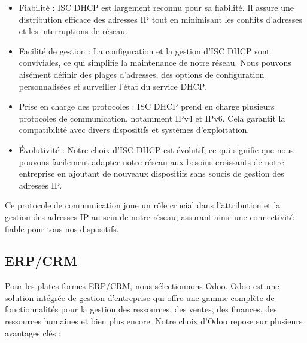 \begin{itemize}

\item Fiabilité : ISC DHCP est largement reconnu pour sa fiabilité. Il assure une distribution efficace des adresses IP tout en minimisant les conflits d'adresses et les interruptions de réseau.

\item Facilité de gestion : La configuration et la gestion d'ISC DHCP sont conviviales, ce qui simplifie la maintenance de notre réseau. Nous pouvons aisément définir des plages d'adresses, des options de configuration personnalisées et surveiller l'état du service DHCP.

\item Prise en charge des protocoles : ISC DHCP prend en charge plusieurs protocoles de communication, notamment IPv4 et IPv6. Cela garantit la compatibilité avec divers dispositifs et systèmes d'exploitation.

\item Évolutivité : Notre choix d'ISC DHCP est évolutif, ce qui signifie que nous pouvons facilement adapter notre réseau aux besoins croissants de notre entreprise en ajoutant de nouveaux dispositifs sans soucis de gestion des adresses IP.

\end{itemize}

Ce protocole de communication joue un rôle crucial dans l'attribution et la gestion des adresses IP au sein de notre réseau, assurant ainsi une connectivité fiable pour tous nos dispositifs.

\subsection{ERP/CRM}

Pour les plates-formes ERP/CRM, nous sélectionnons Odoo. Odoo est une solution intégrée de gestion d'entreprise qui offre une gamme complète de fonctionnalités pour la gestion des ressources, des ventes, des finances, des ressources humaines et bien plus encore. Notre choix d'Odoo repose sur plusieurs avantages clés :

